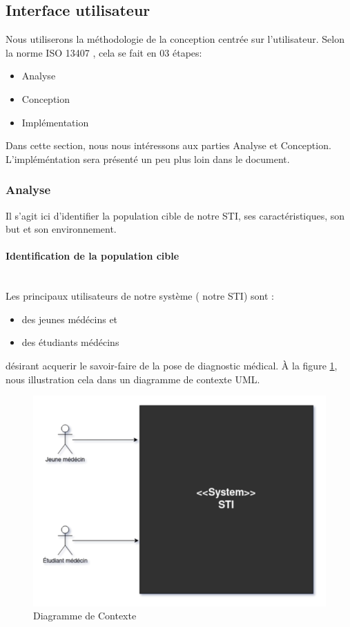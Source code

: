     \subsection{Interface utilisateur}
    Nous utiliserons la méthodologie de la conception centrée sur l'utilisateur. Selon la norme ISO 13407 \cite{iso13407}, cela se fait en 03 étapes:
    \begin{itemize}
        \item Analyse
        \item Conception
        \item Implémentation
    \end{itemize}

    Dans cette section, nous nous intéressons aux parties Analyse et Conception. L'impléméntation sera présenté un peu plus loin dans le document.
    
    \subsubsection{Analyse}
    Il s'agit ici d'identifier la population cible de notre STI, ses caractéristiques, son but et son environnement.
    
    \paragraph{Identification de la population cible} \hfill \\
    Les principaux utilisateurs de notre système ( notre STI) sont :
    \begin{itemize}
        \item des jeunes médécins et
        \item des étudiants médécins
    \end{itemize}
    désirant acquerir le savoir-faire de la pose de diagnostic médical.  À la figure \ref{fig:uml_context}, nous illustration cela dans un diagramme de contexte UML.
    
    \begin{figure}[H]
        \centering
        \includegraphics[width=\textwidth]{figures/context.png}
        \captionsetup{justification=centering}
        \caption{Diagramme de Contexte}
        \label{fig:uml_context}
    \end{figure}
    
